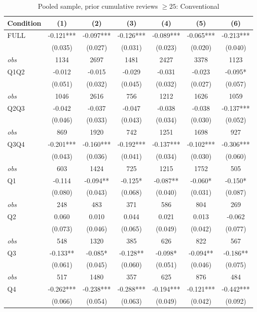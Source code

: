 \begin{table}[!htbp]
\centering
\caption{Pooled sample, prior cumulative reviews $\geq25$: Conventional}
\begin{tabular}{lcccccc}
\toprule
Condition & (1) & (2) & (3) & (4) & (5) & (6) \\
\midrule
FULL & -0.121*** & -0.097*** & -0.126*** & -0.089*** & -0.065*** & -0.213*** \\
 & (0.035) & (0.027) & (0.031) & (0.023) & (0.020) & (0.040) \\
\textit{obs} & 1134 & 2697 & 1481 & 2427 & 3378 & 1123 \\
Q1Q2 & -0.012 & -0.015 & -0.029 & -0.031 & -0.023 & -0.095* \\
 & (0.051) & (0.032) & (0.045) & (0.032) & (0.027) & (0.057) \\
\textit{obs} & 1046 & 2616 & 756 & 1212 & 1626 & 1059 \\
Q2Q3 & -0.042 & -0.037 & -0.047 & -0.038 & -0.038 & -0.137*** \\
 & (0.046) & (0.033) & (0.043) & (0.034) & (0.030) & (0.052) \\
\textit{obs} & 869 & 1920 & 742 & 1251 & 1698 & 927 \\
Q3Q4 & -0.201*** & -0.160*** & -0.192*** & -0.137*** & -0.102*** & -0.306*** \\
 & (0.043) & (0.036) & (0.041) & (0.034) & (0.030) & (0.060) \\
\textit{obs} & 603 & 1424 & 725 & 1215 & 1752 & 505 \\
Q1 & -0.114 & -0.094** & -0.125* & -0.087** & -0.060* & -0.150* \\
 & (0.080) & (0.043) & (0.068) & (0.040) & (0.031) & (0.087) \\
\textit{obs} & 248 & 483 & 371 & 586 & 804 & 269 \\
Q2 & 0.060 & 0.010 & 0.044 & 0.021 & 0.013 & -0.062 \\
 & (0.073) & (0.046) & (0.065) & (0.049) & (0.042) & (0.077) \\
\textit{obs} & 548 & 1320 & 385 & 626 & 822 & 567 \\
Q3 & -0.133** & -0.085* & -0.128** & -0.098* & -0.094** & -0.186** \\
 & (0.061) & (0.045) & (0.060) & (0.051) & (0.046) & (0.075) \\
\textit{obs} & 517 & 1480 & 357 & 625 & 876 & 484 \\
Q4 & -0.262*** & -0.238*** & -0.288*** & -0.194*** & -0.121*** & -0.442*** \\
 & (0.066) & (0.054) & (0.063) & (0.049) & (0.042) & (0.092) \\

\end{tabular}
\end{table}
